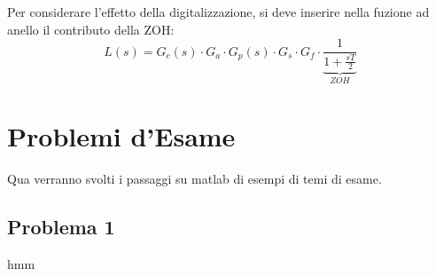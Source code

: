 \documentclass[12pt]{article}
\begin{document}
Per considerare l'effetto della digitalizzazione, si deve inserire nella fuzione ad anello il contributo della ZOH:
\[ L(s) = G_c(s)\cdot G_a\cdot G_p(s)\cdot G_s\cdot G_f\cdot  \underbrace{\frac{1}{\displaystyle 1 + \frac{sT}{2} }}_{ZOH}  \]















\newpage
\section{Problemi d'Esame}
Qua verranno svolti i passaggi su matlab di esempi di temi di esame.

\subsection{Problema 1}
hmm
\end{document}
